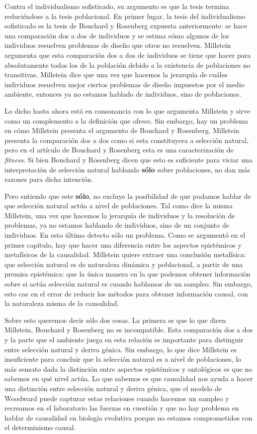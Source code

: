Contra el individualismo sofisticado, su argumento es que la tesis termina reduciéndose a la tesis poblacional. En primer lugar, la tesis del individualismo sofisticado es la tesis de Bouchard y Rosenberg expuesta anteriormente: se hace una comparación dos a dos de individuos y se estima cómo algunos de los individuos resuelven problemas de diseño que otros no resuelven. Millstein argumenta que esta comparación dos a dos de individuos se tiene que hacer para absolutamente todos los de la población debido a la existencia de poblaciones no transitivas. Millstein dice que una vez que hacemos la jerarquía de cuáles individuos resuelven mejor ciertos problemas de diseño impuestos por el medio ambiente, entonces ya no estamos hablado de individuos, sino de poblaciones.

Lo dicho hasta ahora está en consonancia con lo que argumenta Millstein y sirve como un complemento a la definición que ofrece. Sin embargo, hay un problema en cómo Millstein presenta el argumento de Bouchard y Rosenberg. Millstein presenta la comparación dos a dos como si esta constituyera a selección natural, pero en el artículo de Bouchard y Rosenberg esta es una caracterización de \emph{fitness}. Si bien Bouchard y Rosenberg dicen que esto es suficiente para viciar una interpretación de selección natural hablando \textbf{sólo} sobre poblaciones, no dan más razones para dicha intención.

Pero entiendo que este \textbf{sólo}, no excluye la posibilidad de que podamos hablar de que selección natural actúa a nivel de poblaciones. Tal como dice la misma Millstein, una vez que hacemos la jerarquía de individuos y la resolución de problemas, ya no estamos hablando de individuos, sino de un conjunto de individuos. En esto último detecto sólo un problema. Como se argumentó en el primer capítulo, hay que hacer una diferencia entre los aspectos epistémicos y metafísicos de la causalidad. Millstein quiere extraer una conclusión metafísica: que selección natural es de naturaleza dinámica y poblacional, a partir de una premisa epistémica: que la única manera en la que podemos obtener información sobre si actúa selección natural es cuando hablamos de un sampleo. Sin embargo, esto cae en el error de reducir los métodos para obtener información causal, con la naturaleza misma de la causalidad.

Sobre esto queremos decir sólo dos cosas. La primera es que lo que dicen Millstein, Bouchard y Rosenberg no es incompatible. Esta comparación dos a dos y la parte que el ambiente juega en esta relación es importante para distinguir entre selección natural y deriva génica. Sin embargo, lo que dice Millstein es insuficiente para concluir que la selección natural es a nivel de poblaciones, lo más sensato dada la distinción entre aspectos epistémicos y ontológicos es que no sabemos en qué nivel actúa. Lo que sabemos es que causalidad nos ayuda a hacer una distinción entre selección natural y deriva génica, que el modelo de Woodward puede capturar estas relaciones cuando hacemos un sampleo y recreamos en el laboratorio las fuerzas en cuestión y que no hay problema en hablar de causalidad en biología evolutiva porque no estamos comprometidos con el determinismo causal.


